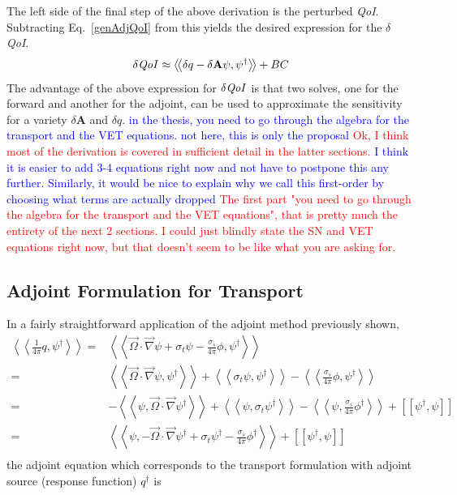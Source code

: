 \documentclass[12pt]{report}
\newcommand{\vO}{\vec{\Omega}}
\newcommand{\braSN}{\left\langle \! \left\langle}
\newcommand{\ketSN}{\right\rangle \! \right\rangle}
\newcommand{\sbraSN}{\left[ \! \left[}
\newcommand{\sketSN}{\right] \! \right]}
\newcommand{\grad}{\vec{\nabla}}
\newcommand{\sigt}{\sigma_t}
\newcommand{\sigs}{\sigma_s}
\newcommand{\angResp}{q^\dag}
\newcommand{\qoi}{{\it QoI}\xspace}
\newcommand{\comment}[2]{\marginpar{\textcolor{#2}{$\star$}}\textcolor{#2}{#1}\newline}
\newcommand{\iwh}[1]{\comment{#1}{red}}
\newcommand{\jcr}[1]{\comment{#1}{blue}}
\newcommand{\iwh}[1]{\phantom{a}}
\newcommand{\jcr}[1]{\phantom{a}}
\begin{document}
The left side of the final step of the above derivation is the perturbed \qoi. Subtracting Eq.~\eqref{genAdjQoI} from this yields the desired expression for the $\delta$ \qoi.
\begin{equation}
\label{genAdjSens}
\delta \qoi \approx \braSN \delta q - \delta \mathbf{A} \psi , \psi^\dag \ketSN + BC
\end{equation}
The advantage of the above expression for $\delta \qoi$ is that two solves, one for the forward and another for the adjoint, can be used to approximate the sensitivity for a variety $\delta \mathbf{A}$ and $\delta q$.
\jcr{in the thesis, you need to go through the algebra for the transport and the VET equations. not here, this is only the proposal}
\iwh{Ok, I think most of the derivation is covered in sufficient detail in the latter sections.}
\jcr{I think it is easier to add 3-4 equations right now and not have to postpone this any further. Similarly, it would be nice to explain why we call this first-order by choosing what terms are actually dropped}
\iwh{The first part "you need to go through the algebra for the transport and the VET equations", that is pretty much the entirety of the next 2 
sections. I could just blindly state the SN and VET equations right now, but that doesn't seem to be like what you are asking for.}

%
%
%
%


\subsection{Adjoint Formulation for Transport}
In a fairly straightforward application of the adjoint method previously shown, 
\begin{equation}
\label{SnAdjDeriv}
\begin{split}
\braSN \frac{1}{4 \pi} q , \psi^\dag  \ketSN  
=& \braSN \vO \cdot \grad \psi + \sigt \psi - \frac{\sigs}{4 \pi} \phi, \psi^\dag \ketSN \\
=& \braSN \vO \cdot \grad \psi, \psi^\dag \ketSN  + \braSN \sigt \psi, \psi^\dag \ketSN  - \braSN \frac{\sigs}{4 \pi}  \phi, \psi^\dag \ketSN \\
=& - \braSN  \psi, \vO \cdot \grad \psi^\dag \ketSN  + \braSN \psi, \sigt \psi^\dag \ketSN  - \braSN   \psi, \frac{\sigs}{4 \pi} \phi^\dag \ketSN + \sbraSN \psi^\dag,  \psi \sketSN\\
=& \braSN  \psi,-  \vO \cdot \grad \psi^\dag  +  \sigt \psi^\dag -  \frac{\sigs}{4 \pi} \phi^\dag \ketSN + \sbraSN \psi^\dag,  \psi \sketSN\\
\end{split}
\end{equation}
the adjoint equation which corresponds to the transport formulation with adjoint source (response function)
$\angResp$ is
\end{document}
